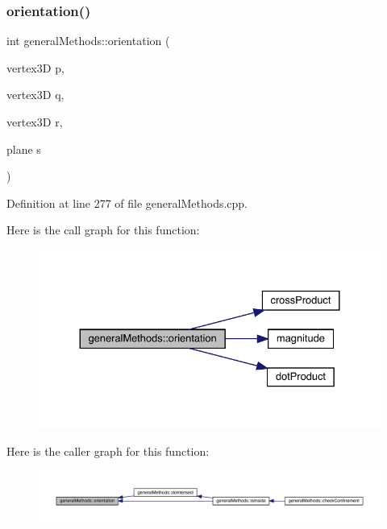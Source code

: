 \subsubsection{\texorpdfstring{orientation()}{orientation()}}
{\footnotesize\ttfamily int general\+Methods\+::orientation (\begin{DoxyParamCaption}\item[{vertex3D}]{p,  }\item[{vertex3D}]{q,  }\item[{vertex3D}]{r,  }\item[{plane}]{s }\end{DoxyParamCaption})}



Definition at line 277 of file general\+Methods.\+cpp.

Here is the call graph for this function\+:
\nopagebreak
\begin{figure}[H]
\begin{center}
\leavevmode
\includegraphics[width=330pt]{namespacegeneral_methods_a7bfbfb2a02328d76e70f66fedd57c4ef_cgraph}
\end{center}
\end{figure}
Here is the caller graph for this function\+:
\nopagebreak
\begin{figure}[H]
\begin{center}
\leavevmode
\includegraphics[width=350pt]{namespacegeneral_methods_a7bfbfb2a02328d76e70f66fedd57c4ef_icgraph}
\end{center}
\end{figure}
\mbox{\label{namespacegeneral_methods_a3c49599a5ba8f2c41f2ef542bde19765}} 
